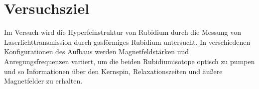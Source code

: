 \section{Versuchsziel}
Im Versuch wird die Hyperfeinstruktur von Rubidium durch die Messung von Laserlichttransmission durch
gasförmiges Rubidium untersucht.
In verschiedenen Konfigurationen des Aufbaus werden Magnetfeldstärken und Anregungsfrequenzen variiert,
um die beiden Rubidiumisotope optisch zu pumpen und so Informationen über
den Kernspin, Relaxationszeiten und äußere Magnetfelder zu erhalten.